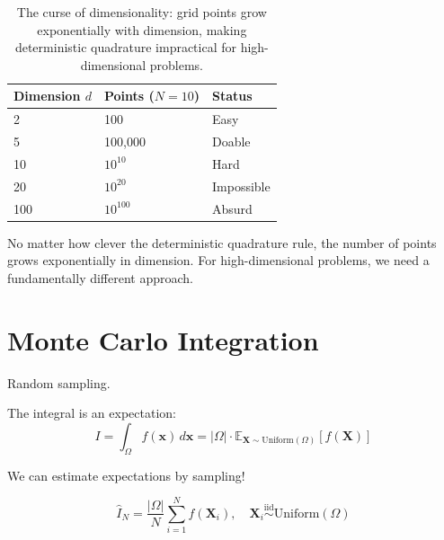\begin{table}[ht]
\centering
\begin{tabular}{p{}p{}p{}}
\toprule
\textbf{Dimension $d$} & \textbf{Points ($N=10$)} & \textbf{Status} \\
\midrule
2 & 100 & Easy \\
5 & 100,000 & Doable \\
10 & $10^{10}$ & Hard \\
20 & $10^{20}$ & Impossible \\
100 & $10^{100}$ & Absurd \\
\bottomrule
\end{tabular}
\vspace{2em}
\caption{The curse of dimensionality: grid points grow exponentially with dimension, making deterministic quadrature impractical for high-dimensional problems.}
\label{tab:curse_dimensionality}
\end{table}

 No matter how clever the deterministic quadrature rule, the number of points grows exponentially in dimension. For high-dimensional problems, we need a fundamentally different approach.




\newpage
\section{Monte Carlo Integration}

 Random sampling.

 The integral is an expectation:
\begin{equation}
    I = \int_\Omega f(\mathbf{x}) \, d\mathbf{x} = |\Omega| \cdot \mathbb{E}_{\mathbf{X} \sim \text{Uniform}(\Omega)}[f(\mathbf{X})]
\end{equation}

We can estimate expectations by sampling!

\begin{equation}
    \boxed{\hat{I}_N = \frac{|\Omega|}{N} \sum_{i=1}^{N} f(\mathbf{X}_i), \quad \mathbf{X}_i \stackrel{\text{iid}}{\sim} \text{Uniform}(\Omega)}
\end{equation}



